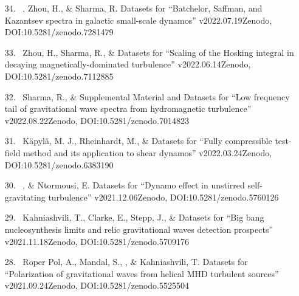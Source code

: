 \begin{itemize}
\item[{34.}~]
\Brandenburg, Zhou, H., \& Sharma, R.
{Datasets for ``Batchelor, Saffman, and Kazantsev spectra in galactic small-scale dynamos'' v2022.07.19}{Zenodo, DOI:10.5281/zenodo.7281479}

\item[{33.}~]
Zhou, H., Sharma, R., \& \Brandenburg{}
{Datasets for ``Scaling of the Hosking integral in decaying magnetically-dominated turbulence'' v2022.06.14}{Zenodo, DOI:10.5281/zenodo.7112885}

\item[{32.}~]
Sharma, R., \& \Brandenburg{}
{Supplemental Material and Datasets for ``Low frequency tail of gravitational wave spectra from hydromagnetic turbulence'' v2022.08.22}{Zenodo, DOI:10.5281/zenodo.7014823}

\item[{31.}~]
K\"apyl\"a, M. J., Rheinhardt, M., \& \Brandenburg{}
{Datasets for ``Fully compressible test-field method and its application to shear dynamos'' v2022.03.24}{Zenodo, DOI:10.5281/zenodo.6383190}

\item[{30.}~]
\Brandenburg, \& Ntormousi, E.
{Datasets for ``Dynamo effect in unstirred self-gravitating turbulence'' v2021.12.06}{Zenodo, DOI:10.5281/zenodo.5760126}

\item[{29.}~]
Kahniashvili, T., Clarke, E., Stepp, J., \& \Brandenburg{}
{Datasets for ``Big bang nucleosynthesis limits and relic gravitational waves detection prospects'' v2021.11.18}{Zenodo, DOI:10.5281/zenodo.5709176}

\item[{28.}~]
Roper Pol, A., Mandal, S., \Brandenburg, \& Kahniashvili, T.
{Datasets for ``Polarization of gravitational waves from helical MHD turbulent sources'' v2021.09.24}{Zenodo, DOI:10.5281/zenodo.5525504}


\end{itemize}
